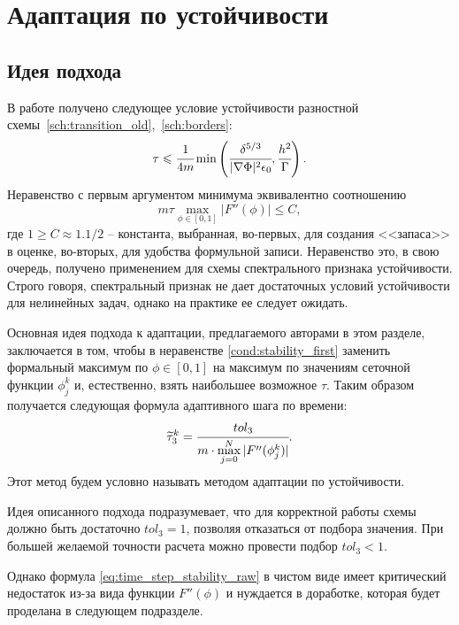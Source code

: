 
\section{Адаптация по устойчивости}

\subsection{Идея подхода}

В работе \cite{ponomarev_stability} получено следующее условие устойчивости разностной схемы~\eqref{sch:transition_old},~\eqref{sch:borders}:
\[
	\tau \leqslant \cfrac{1}{4m} \min \left( \cfrac{\delta^{5/3}}{|\nabla \Phi|^2 \epsilon_0}, \cfrac{h^2}{\Gamma} \right).
\]
Неравенство с первым аргументом минимума эквивалентно соотношению
\begin{equation}
	m \tau \max\limits_{\phi \in [0, 1]} |F''(\phi)| \leqslant C,
	\label{cond:stability_first}
\end{equation}
где $1 \geqslant C \approx 1.1 / 2$ -- константа, выбранная, во-первых, для создания <<запаса>> в оценке, во-вторых, для удобства формульной записи. Неравенство это, в свою очередь, получено применением для схемы спектрального признака устойчивости. Строго говоря, спектральный признак не дает достаточных условий устойчивости для нелинейных задач, однако на практике ее следует ожидать.

Основная идея подхода к адаптации, предлагаемого авторами в этом разделе, заключается в том, чтобы в неравенстве \eqref{cond:stability_first} заменить формальный максимум по $\phi \in [0, 1]$ на максимум по значениям сеточной функции $\phi_j^k$ и, естественно, взять наибольшее возможное $\tau$. Таким образом получается следующая формула адаптивного шага по времени:
\begin{equation}
	\widetilde{\tau}_3^k = \cfrac{tol_3}{m \cdot \max\limits_{j = 0}^N |F''(\phi_j^k)|}.
	\label{eq:time_step_stability_raw}
\end{equation}
Этот метод будем условно называть методом адаптации по устойчивости.

Идея описанного подхода подразумевает, что для корректной работы схемы должно быть достаточно $tol_3 = 1$, позволяя отказаться от подбора значения. При большей желаемой точности расчета можно провести подбор $tol_3 < 1$.

Однако формула \eqref{eq:time_step_stability_raw} в чистом виде имеет критический недостаток из-за вида функции $F''(\phi)$ и нуждается в доработке, которая будет проделана в следующем подразделе.


